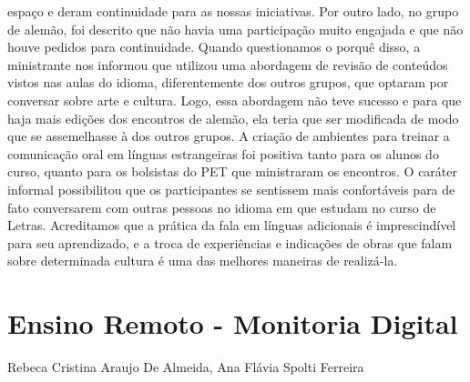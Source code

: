 espaço e deram continuidade para as nossas iniciativas. Por outro lado, no grupo de alemão, foi
descrito que não havia uma participação muito engajada e que não houve pedidos para
continuidade. Quando questionamos o porquê disso, a ministrante nos informou que utilizou uma
abordagem de revisão de conteúdos vistos nas aulas do idioma, diferentemente dos outros
grupos, que optaram por conversar sobre arte e cultura. Logo, essa abordagem não teve sucesso e
para que haja mais edições dos encontros de alemão, ela teria que ser modificada de modo que
se assemelhasse à dos outros grupos.
A criação de ambientes para treinar a comunicação oral em línguas estrangeiras foi positiva
tanto para os alunos do curso, quanto para os bolsistas do PET que ministraram os encontros. O
caráter informal possibilitou que os participantes se sentissem mais confortáveis para de fato
conversarem com outras pessoas no idioma em que estudam no curso de Letras. Acreditamos
que a prática da fala em línguas adicionais é imprescindível para seu aprendizado, e a troca de
experiências e indicações de obras que falam sobre determinada cultura é uma das melhores
maneiras de realizá-la.




\section*{Ensino Remoto - Monitoria Digital}

Rebeca Cristina Araujo De Almeida, Ana Flávia Spolti Ferreira

